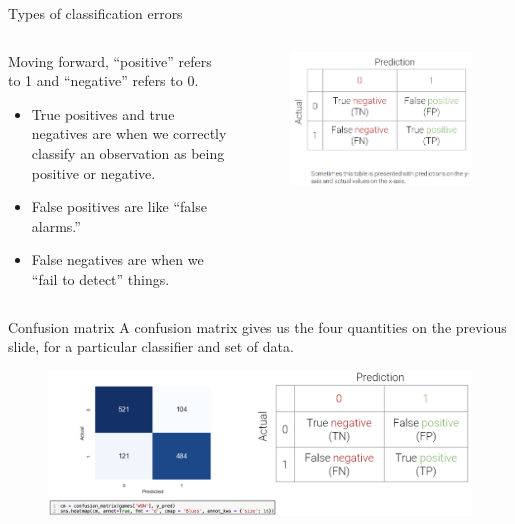 \documentclass[aspectratio=169]{../latex_main/tntbeamer}  %
\begin{document}
	\begin{frame}[c]{Types of classification errors}
	    \begin{columns}
	        \begin{column}{.5\textwidth}
                 Moving forward, “positive” refers to 1 and “negative” refers to 0.
        	    \begin{itemize}
        	        \item True positives and true negatives are when we correctly classify an observation as being positive or negative.
        	        \item False positives are like “false alarms.”
        	        \item False negatives are when we “fail to detect” things.
        	    \end{itemize}
	        \end{column}
	        
	        
	        \begin{column}{.5\textwidth}
	                \begin{figure}
	                    \centering
	                    \includegraphics[scale=.38]{Bild7}
	                \end{figure}
	        \end{column}
	    \end{columns}
	   
	\end{frame}
	
	
	\begin{frame}{Confusion matrix}
	    A confusion matrix gives us the four quantities on the previous slide, for a particular classifier and set of data.
	    \begin{figure}
	        \centering
	        \includegraphics[scale=.4]{Bild8}
	    \end{figure}
	\end{frame}
	
\end{document}
